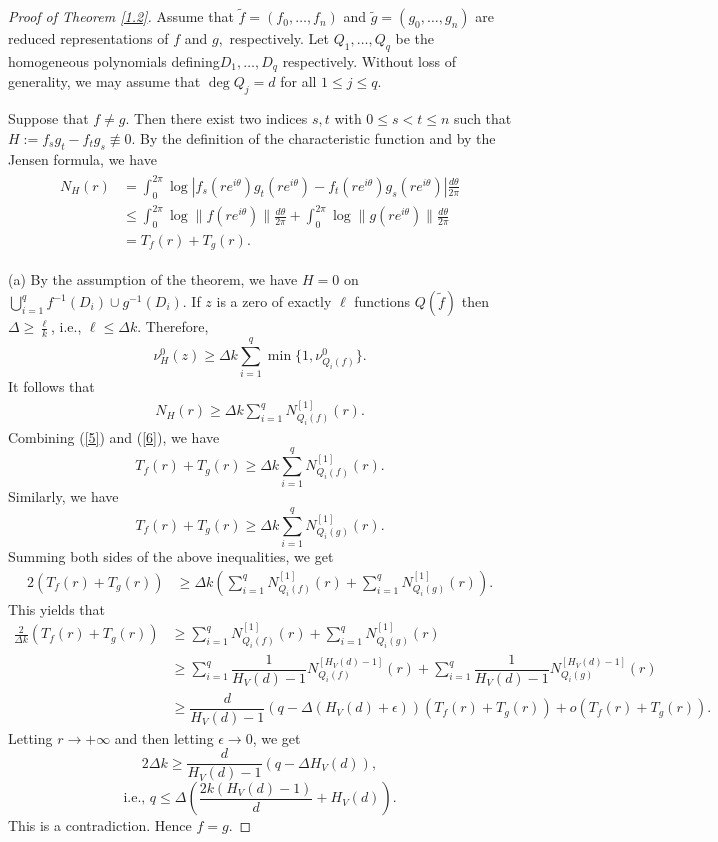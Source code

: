 \documentclass[10pt,a4paper]{amsart}
\begin{document}
\begin{proof}[Proof of Theorem \ref{1.2}]
Assume that $\tilde f=(f_0,\ldots,f_n)$ and $\tilde g=(g_0,\ldots,g_n)$ are reduced representations of $f$ and $g,$ respectively. Let $Q_1,\ldots,Q_q$ be the homogeneous polynomials defining$D_1,\ldots,D_q$ respectively. Without loss of generality, we may assume that $\deg Q_j=d$ for all $1\le j\le q$.

Suppose that $f\ne g$. Then there exist two indices $s,t$ with $0\le s<t\le n$ such that $ H:=f_sg_t-f_tg_s\not\equiv 0.$
By the definition of the characteristic function and by the Jensen formula, we have
\begin{align}\label{5}
\begin{split}
N_H(r)&=\int_{0}^{2\pi}\log |f_s(re^{i\theta})g_t(re^{i\theta})-f_t(re^{i\theta})g_s(re^{i\theta})|\frac{d\theta}{2\pi}\\ 
& \le \int_{0}^{2\pi}\log \|f(re^{i\theta})\|\frac{d\theta}{2\pi} + \int_{0}^{2\pi}\log \|g(re^{i\theta})\|\frac{d\theta}{2\pi} \\
&=T_f(r)+T_g(r).
\end{split}
\end{align}

(a) By the assumption of the theorem, we have $H=0$ on $\bigcup_{i=1}^qf^{-1}(D_i)\cup g^{-1}(D_i)$. 
If $z$ is a zero of exactly $\ell$ functions $Q(\tilde f)$ then $\Delta\ge\frac{\ell}{k}$, i.e., $\ell\le\Delta k.$
Therefore, 
$$\nu^0_H(z)\ge \Delta k\sum_{i=1}^q\min\{1,\nu^0_{Q_i(f)}\}.$$
It follows that
\begin{align}\label{6}
N_H(r)\ge \Delta k\sum_{i=1}^qN^{[1]}_{Q_i(f)}(r).
\end{align}
Combining (\ref{5}) and (\ref{6}), we have
$$ T_f(r)+T_g(r) \ge \Delta k\sum_{i=1}^qN^{[1]}_{Q_i(f)}(r).$$
Similarly, we have
$$ T_f(r)+T_g(r) \ge \Delta k\sum_{i=1}^qN^{[1]}_{Q_i(g)}(r).$$
Summing both sides of the above inequalities, we get
\begin{align*}
 2(T_f(r)+T_g(r))& \ge \Delta k\left(\sum_{i=1}^qN^{[1]}_{Q_i(f)}(r)+\sum_{i=1}^qN^{[1]}_{Q_i(g)}(r)\right).
\end{align*}
This yields that
\begin{align*}
\frac{2}{\Delta k}(T_f(r)+T_g(r))&\ge\sum_{i=1}^qN^{[1]}_{Q_i(f)}(r)+\sum_{i=1}^qN^{[1]}_{Q_i(g)}(r)\\
&\ge \sum_{i=1}^q\dfrac{1}{H_V(d)-1}N^{[H_V(d)-1]}_{Q_i(f)}(r)+\sum_{i=1}^q\dfrac{1}{H_V(d)-1}N^{[H_V(d)-1]}_{Q_i(g)}(r)\\
&\ge \dfrac{d}{H_V(d)-1}(q-\Delta (H_V(d)+\epsilon))(T_f(r)+T_g(r))+o(T_f(r)+T_g(r)).
\end{align*}
Letting $r\longrightarrow +\infty$ and then letting $\epsilon\longrightarrow 0$, we get 
$$2\Delta k\ge \dfrac{d}{H_V(d)-1}(q-\Delta H_V(d)),$$
$$\text{i.e., } q\le \Delta\left(\frac{2k(H_V(d)-1)}{d}+ H_V(d)\right).$$
This is a contradiction.
Hence $f=g$.


\end{proof}
\end{document}
